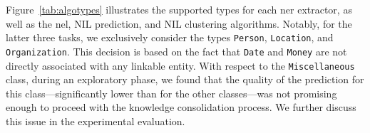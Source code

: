 Figure~\ref{tab:algotypes} illustrates the supported types for each \ac{ner} extractor, as well as the \ac{nel}, NIL prediction, and NIL clustering algorithms. Notably, for the latter three tasks, we exclusively consider the types \texttt{Person}, \texttt{Location}, and \texttt{Organization}. This decision is based on the fact that \texttt{Date} and \texttt{Money} are not directly associated with any linkable entity. With respect to the \texttt{Miscellaneous} class, during an exploratory phase, we found that the quality of the prediction for this class---significantly lower than for the other classes---was not promising enough to proceed with the knowledge consolidation process. We further discuss this issue in the experimental evaluation.



